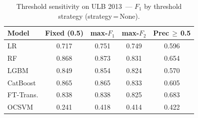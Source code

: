 \begin{table}[H]
\centering
\caption{Threshold sensitivity on ULB 2013~--- $F_1$ by threshold strategy (strategy\,=\,None).}
\label{tab:threshold_ulb_f1}
\begin{tabular}{l c c c c}
\toprule
Model & Fixed (0.5) & max-$F_1$ & max-$F_2$ & Prec\,$\geq$\,0.5 \\
\midrule
LR         & 0.717 & 0.751 & 0.749 & 0.596 \\
RF         & 0.868 & 0.873 & 0.831 & 0.654 \\
LGBM       & 0.849 & 0.854 & 0.824 & 0.570 \\
CatBoost   & 0.865 & 0.865 & 0.833 & 0.605 \\
FT-Trans.  & 0.838 & 0.838 & 0.825 & 0.683 \\
OCSVM      & 0.241 & 0.418 & 0.414 & 0.422 \\
\bottomrule
\end{tabular}
\end{table}